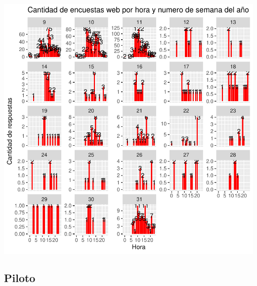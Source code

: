 \documentclass{article}
\begin{document}
\includegraphics{seguimientov5-006}

\subsection{Piloto}
\end{document}
